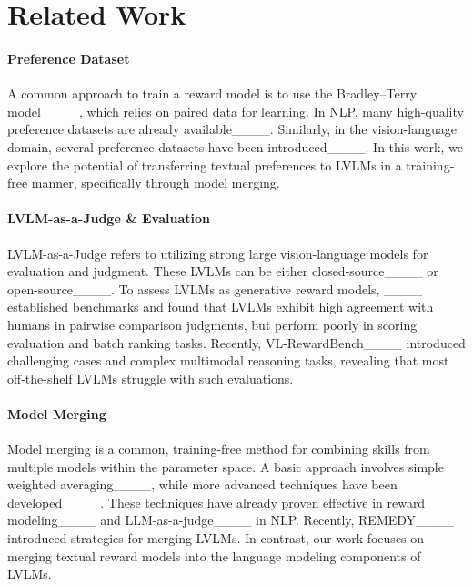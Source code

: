 \section{Related Work}
\label{sec:related_work}
\paragraph{Preference Dataset} A common approach to train a reward model is to use the Bradley–Terry model____, which relies on paired data for learning. In NLP, many high-quality preference datasets are already available____. Similarly, in the vision-language domain, several preference datasets have been introduced____. In this work, we explore the potential of transferring textual preferences to LVLMs in a training-free manner, specifically through model merging.

\vspace{-3pt}
\paragraph{LVLM-as-a-Judge \& Evaluation} LVLM-as-a-Judge refers to utilizing strong large vision-language models for evaluation and judgment. These LVLMs can be either closed-source____ or open-source____. To assess LVLMs as generative reward models, ____ established benchmarks and found that LVLMs exhibit high agreement with humans in pairwise comparison judgments, but perform poorly in scoring evaluation and batch ranking tasks. Recently, VL-RewardBench____ introduced challenging cases and complex multimodal reasoning tasks, revealing that most off-the-shelf LVLMs struggle with such evaluations.

\vspace{-3pt}
\paragraph{Model Merging} Model merging is a common, training-free method for combining skills from multiple models within the parameter space. A basic approach involves simple weighted averaging____, while more advanced techniques have been developed____. These techniques have already proven effective in reward modeling____ and LLM-as-a-judge____ in NLP. Recently, REMEDY____ introduced strategies for merging LVLMs. In contrast, our work focuses on merging textual reward models into the language modeling components of LVLMs.